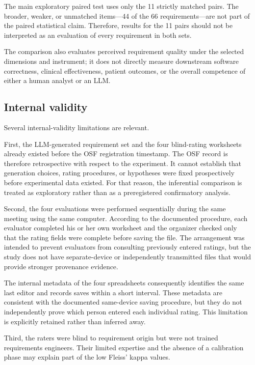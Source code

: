 \documentclass[pdflatex,sn-basic]{sn-jnl}
\begin{document}
The main exploratory paired test uses only the 11 strictly matched pairs. The broader, weaker, or unmatched items---44 of the 66 requirements---are not part of the paired statistical claim. Therefore, results for the 11 pairs should not be interpreted as an evaluation of every requirement in both sets.

The comparison also evaluates perceived requirement quality under the selected dimensions and instrument; it does not directly measure downstream software correctness, clinical effectiveness, patient outcomes, or the overall competence of either a human analyst or an LLM.

\subsection{Internal validity}

Several internal-validity limitations are relevant.

First, the LLM-generated requirement set and the four blind-rating worksheets already existed before the OSF registration timestamp. The OSF record is therefore retrospective with respect to the experiment. It cannot establish that generation choices, rating procedures, or hypotheses were fixed prospectively before experimental data existed. For that reason, the inferential comparison is treated as exploratory rather than as a preregistered confirmatory analysis.

Second, the four evaluations were performed sequentially during the same meeting using the same computer. According to the documented procedure, each evaluator completed his or her own worksheet and the organizer checked only that the rating fields were complete before saving the file. The arrangement was intended to prevent evaluators from consulting previously entered ratings, but the study does not have separate-device or independently transmitted files that would provide stronger provenance evidence.

The internal metadata of the four spreadsheets consequently identifies the same last editor and records saves within a short interval. These metadata are consistent with the documented same-device saving procedure, but they do not independently prove which person entered each individual rating. This limitation is explicitly retained rather than inferred away.

Third, the raters were blind to requirement origin but were not trained requirements engineers. Their limited expertise and the absence of a calibration phase may explain part of the low Fleiss' kappa values.
\end{document}
